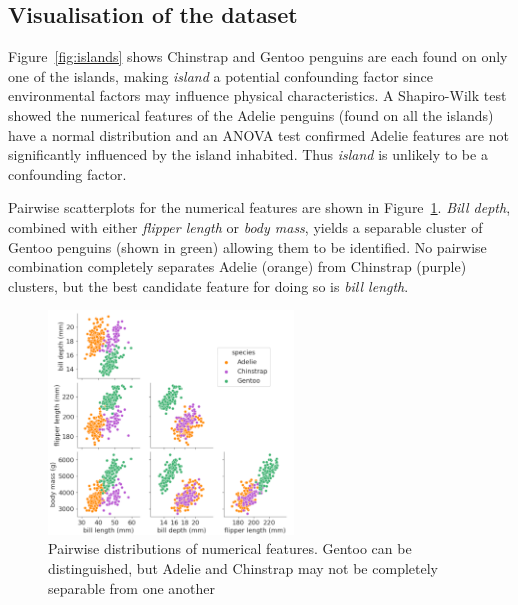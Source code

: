 \documentclass[a4paper, 11pt]{article}
\begin{document}
\subsection*{Visualisation of the dataset}

Figure~\ref{fig:islands} shows Chinstrap and Gentoo penguins are each found on only one of the islands, making \textit{island} a potential confounding factor since 
environmental factors may influence physical characteristics. A Shapiro-Wilk test showed  
the numerical features of the Adelie penguins (found on all the islands) have a normal distribution and an ANOVA test confirmed Adelie features are not 
significantly influenced by the island inhabited. Thus \textit{island} is unlikely to be a confounding factor.

Pairwise scatterplots for the numerical features are shown in Figure~\ref{fig:pairwise}. 
\textit{Bill depth}, combined with either \textit{flipper length} or \textit{body mass}, 
yields a separable cluster of Gentoo penguins (shown in green) allowing them to be identified. 
No pairwise combination completely separates Adelie (orange) from Chinstrap (purple) clusters, 
but the best candidate feature for doing so is \textit{bill length}.

\begin{figure} %
  \centering
  \vspace{-1\baselineskip} %
  \includegraphics[width=0.58\textwidth]{pairwise.png} %
  \vspace{-1.5\baselineskip} %
  \caption{\centering\linespread{0.8}\selectfont Pairwise distributions of numerical features. Gentoo can be distinguished, 
  but Adelie and Chinstrap may not be completely separable from one another}
  \vspace{-2.5\baselineskip} %
  \label{fig:pairwise}
\end{figure}
\end{document}
